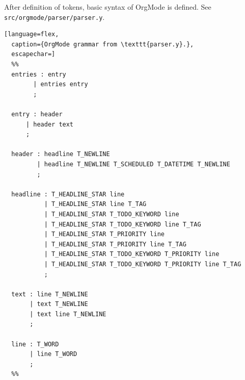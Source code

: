 \documentclass[a4paper,12pt,oneside]{scrartcl}
\begin{document}

After definition of tokens, basic syntax of OrgMode is defined. See
\texttt{src/orgmode/parser/parser.y}.

\begin{lstlisting}[language=flex,
  caption={OrgMode grammar from \texttt{parser.y}.},
  escapechar=]
  %%
  entries : entry
        | entries entry
        ;

  entry : header
      | header text
      ;

  header : headline T_NEWLINE
         | headline T_NEWLINE T_SCHEDULED T_DATETIME T_NEWLINE
         ;

  headline : T_HEADLINE_STAR line
           | T_HEADLINE_STAR line T_TAG
           | T_HEADLINE_STAR T_TODO_KEYWORD line
           | T_HEADLINE_STAR T_TODO_KEYWORD line T_TAG
           | T_HEADLINE_STAR T_PRIORITY line
           | T_HEADLINE_STAR T_PRIORITY line T_TAG
           | T_HEADLINE_STAR T_TODO_KEYWORD T_PRIORITY line
           | T_HEADLINE_STAR T_TODO_KEYWORD T_PRIORITY line T_TAG
           ;

  text : line T_NEWLINE
       | text T_NEWLINE
       | text line T_NEWLINE
       ;

  line : T_WORD
       | line T_WORD
       ;
  %%
\end{lstlisting}

\newpage

\printbibliography[heading=bibintoc]
\end{document}
